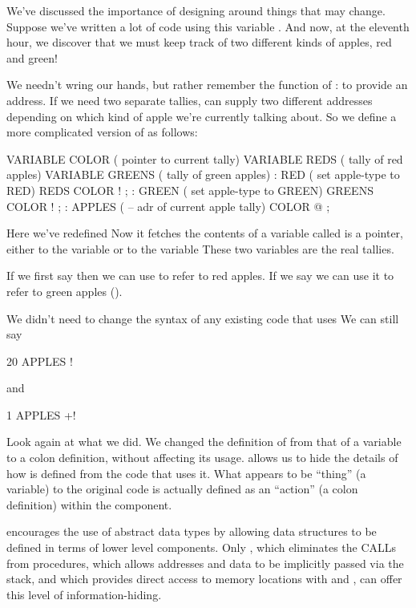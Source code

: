 We've discussed the importance of designing around things that may
change. Suppose we've written a lot of code using this variable
.  And now, at the eleventh hour, we discover that we
must keep track of two different kinds of apples, red and green!

We needn't wring our hands, but rather remember the function of
: to provide an address. If we need two separate
tallies,  can supply two different addresses depending
on which kind of apple we're currently talking about. So we define a
more complicated version of
 as follows:

\begin{Code}
VARIABLE COLOR  ( pointer to current tally)
VARIABLE REDS  ( tally of red apples)
VARIABLE GREENS  ( tally of green apples)
: RED  ( set apple-type to RED)  REDS COLOR ! ;
: GREEN  ( set apple-type to GREEN)  GREENS COLOR ! ;
: APPLES  (  -- adr of current apple tally)  COLOR @ ;
\end{Code}


\noindent Here we've redefined  Now it fetches the contents
of a variable called   is a pointer, either to
the variable  or to the variable  These two
variables are the real tallies.

If we first say  then we can use  to refer
to red apples.  If we say  we can use it to refer to
green apples ().

We didn't need to change the syntax of any existing code that uses
 We can still say

\begin{Code}
20 APPLES !
\end{Code}
and

\begin{Code}
1 APPLES +!
\end{Code}
Look again at what we did. We changed the definition of 
from that of a variable to a colon definition, without affecting its
usage.  \Forth{} allows us to hide the details of how  is
defined from the code that uses it. What appears to be ``thing'' (a
variable) to the original code is actually defined as an ``action'' (a
colon definition) within the component.

\Forth{} encourages the use of abstract data types by allowing data
structures to be defined in terms of lower level components. Only
\Forth{}, which eliminates the CALLs from procedures, which allows
addresses and data to be implicitly passed via the stack, and which
provides direct access to memory locations with  and
\forth{!}, can offer this level of information-hiding.

